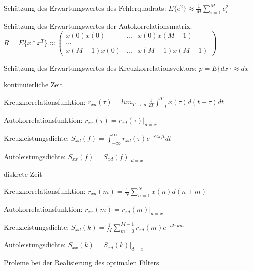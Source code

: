 \documentclass[a4paper]{article}
\begin{document}
\begin{multicols}{3}
\begin{itemize*}
    \item Schätzung des Erwartungswertes des Fehlerquadrats: $E\{e^2\}\approx \frac{1}{M}\sum_{i=1}^M e_i^2$
    \item Schätzung des Erwartungswertes der Autokorrelationsmatrix: $R=E\{x*x^T\}\approx\begin{pmatrix} x(0)x(0) &...& x(0)x(M-1)\\ ...\\ x(M-1)x(0)& ...& x(M-1)x(M-1)\end{pmatrix}$
    \item Schätzung des Erwartungswertes des Kreuzkorrelationsvektors: $p=E\{dx\}\approx dx$
    \item kontinuierliche Zeit
    \begin{itemize*}
      \item Kreuzkorrelationsfunktion: $r_{xd}(\tau)=lim_{T\rightarrow\infty}\frac{1}{2T}\int_{-T}^T x(\tau)d(t+\tau)dt$
      \item Autokorrelationsfunktion: $r_{xx}(\tau)=r_{xd}(\tau)|_{d=x}$
      \item Kreuzleistungsdichte: $S_{xd}(f)=\int_{-\infty}^{\infty} r_{xd}(\tau)e^{-i2\pi ft}dt$
      \item Autoleistungsdichte: $S_{xx}(f)=S_{xd}(f)|_{d=x}$
    \end{itemize*}
    \item diskrete Zeit
    \begin{itemize*}
      \item Kreuzkorrelationsfunktion: $r_{xd}(m)=\frac{1}{N}\sum_{n=1}^N x(n)d(n+m)$
      \item Autokorrelationsfunktion: $r_{xx}(m)=r_{xd}(m)|_{d=x}$
      \item Kreuzleistungsdichte: $S_{xd}(k)=\frac{1}{M}\sum_{m=0}^{M-1} r_{xd}(m)e^{-i2\pi km}$
      \item Autoleistungsdichte: $S_{xx}(k)=S_{xd}(k)|_{d=x}$
    \end{itemize*}
  \end{itemize*}

  Proleme bei der Realisierung des optimalen Filters


\end{multicols}
\end{document}

